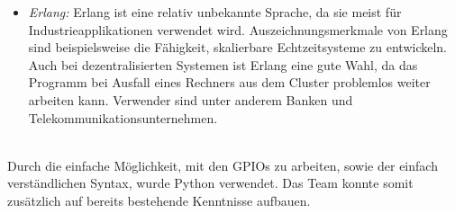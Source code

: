 \begin{itemize}
  \item \textit{Erlang: } Erlang ist eine relativ unbekannte Sprache, da sie meist für Industrieapplikationen verwendet wird. Auszeichnungsmerkmale von Erlang sind beispielsweise die Fähigkeit, skalierbare Echtzeitsysteme zu entwickeln. Auch bei dezentralisierten Systemen ist Erlang eine gute Wahl, da das Programm bei Ausfall eines Rechners aus dem Cluster problemlos weiter arbeiten kann. Verwender sind unter anderem Banken und Telekommunikationsunternehmen.
\end{itemize}
\cite{RaspberryProgramming}\\
Durch die einfache Möglichkeit, mit den GPIOs zu arbeiten, sowie der einfach verständlichen Syntax, wurde Python verwendet. Das Team konnte somit zusätzlich auf bereits bestehende Kenntnisse aufbauen.